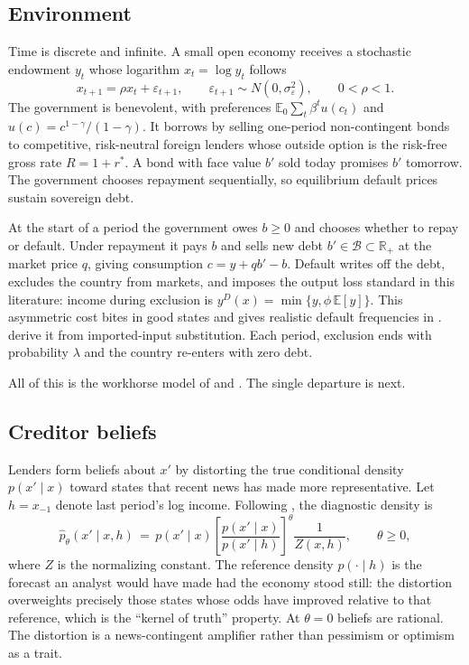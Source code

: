 \documentclass[11pt]{article}
\theoremstyle{definition}
\newcommand{\E}{\mathbb{E}}
\newcommand{\R}{\mathbb{R}}
\begin{document}
\subsection{Environment}

Time is discrete and infinite. A small open economy receives a stochastic endowment $y_t$ whose logarithm $x_t = \log y_t$ follows
\begin{equation}
x_{t+1} = \rho x_t + \varepsilon_{t+1}, \qquad \varepsilon_{t+1} \sim N(0, \sigma_\varepsilon^2), \qquad 0 < \rho < 1.
\label{eq:ar1}
\end{equation}
The government is benevolent, with preferences $\E_0 \sum_t \beta^t u(c_t)$ and $u(c) = c^{1-\gamma}/(1-\gamma)$. It borrows by selling one-period non-contingent bonds to competitive, risk-neutral foreign lenders whose outside option is the risk-free gross rate $R = 1 + r^*$. A bond with face value $b'$ sold today promises $b'$ tomorrow. The government chooses repayment sequentially, so equilibrium default prices sustain sovereign debt.

At the start of a period the government owes $b \geq 0$ and chooses whether to repay or default. Under repayment it pays $b$ and sells new debt $b' \in \mathcal{B} \subset \R_+$ at the market price $q$, giving consumption $c = y + q b' - b$. Default writes off the debt, excludes the country from markets, and imposes the output loss standard in this literature: income during exclusion is $y^D(x) = \min\{y, \phi\, \E[y]\}$. This asymmetric cost bites in good states and gives realistic default frequencies in \citet{Arellano2008}. \citet{MendozaYue2012} derive it from imported-input substitution. Each period, exclusion ends with probability $\lambda$ and the country re-enters with zero debt.

All of this is the workhorse model of \citet{EatonGersovitz1981} and \citet{Arellano2008}. The single departure is next.

\subsection{Creditor beliefs}\label{sec:beliefs}

Lenders form beliefs about $x'$ by distorting the true conditional density $p(x' \mid x)$ toward states that recent news has made more representative. Let $h = x_{-1}$ denote last period's log income. Following \citet{BordaloGennaioliShleifer2018}, the diagnostic density is
\begin{equation}
\hat p_\theta(x' \mid x, h) \,=\, p(x' \mid x)\left[\frac{p(x' \mid x)}{p(x' \mid h)}\right]^{\theta} \frac{1}{Z(x,h)}, \qquad \theta \geq 0,
\label{eq:diagnostic}
\end{equation}
where $Z$ is the normalizing constant. The reference density $p(\cdot \mid h)$ is the forecast an analyst would have made had the economy stood still: the distortion overweights precisely those states whose odds have improved relative to that reference, which is the \enquote{kernel of truth} property. At $\theta = 0$ beliefs are rational. The distortion is a news-contingent amplifier rather than pessimism or optimism as a trait.
\end{document}
